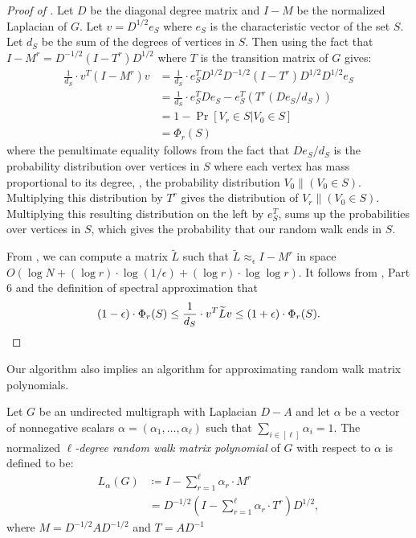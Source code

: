 \documentclass{toc}
\newcommand{\wt}{\widetilde}   %
\newcommand{\SC}{O(\log N + (\log r)\cdot\log(1/\epsilon)+(\log r)\cdot \log\log r)}
\numberwithin{myalgctr}{section}
\theoremstyle{named}
\begin{document}
\begin{proof}[Proof of ]
Let $D$ be the diagonal degree matrix and $I-M$ be the normalized Laplacian of $G$. Let $v=D^{1/2}e_S$ where $e_S$ is the characteristic vector of the set $S$. Let $d_S$ be the sum of the degrees of vertices in $S$. Then using the fact that $I-M^r=D^{-1/2}(I-T^r)D^{1/2}$ where $T$ is the transition matrix of $G$ gives:
\begin{align*}
\frac{1}{d_S}\cdot v^{T}(I-M^r)v &= \frac{1}{d_S}\cdot e_S^{T}D^{1/2}D^{-1/2}(I-T^r)D^{1/2}D^{1/2}e_S \\
&=\frac{1}{d_S}\cdot e_S^{T}De_{S} -  e_S^{T}(T^{r}(De_S/d_S))\\
&=1-\Pr[V_r\in S| V_0\in S]\\
&=\Phi_r(S)
\end{align*}
where the penultimate equality follows from the fact that $De_S/d_S$ is the probability distribution over vertices in $S$ where each vertex has mass proportional to its degree, \ie, the probability distribution $V_0\|(V_0\in S)$. Multiplying this distribution by $T^r$ gives the distribution of $V_r\|(V_0\in S)$. Multiplying this resulting distribution on the left by $e_S^{T}$, sums up the probabilities over vertices in $S$, which gives the probability that our random walk ends in $S$. 

{}From , we can compute a matrix $\wt{L}$ such that $\wt{L}\approx_{\epsilon} I-M^r$ in space $\SC$. It follows from , Part 6 and the definition of spectral approximation that 
\[
(1-\epsilon)\cdot \Phi_{r}(S)\leq \frac{1}{d_S}\cdot v^{T}\wt{L}v\leq (1+\epsilon)\cdot \Phi_{r}(S).    \qedhere
\]
\end{proof}
Our algorithm also implies an algorithm for approximating random walk matrix polynomials.
\begin{definition}
Let $G$ be an undirected multigraph with Laplacian $D-A$ and let $\alpha$ be a vector of nonnegative scalars $\alpha=(\alpha_1,\ldots,\alpha_{\ell})$ such that $\sum_{i\in[\ell]}\alpha_i=1$. The normalized \emph{$\ell$-degree random walk matrix polynomial} of $G$ with respect to $\alpha$ is defined to be:
\begin{align*}
L_{\alpha}(G)&\coloneqq I-\sum_{r=1}^{\ell}\alpha_{r}\cdot M^r\\
&=D^{-1/2}\left(I-\sum_{r=1}^{\ell}\alpha_r\cdot T^r\right)D^{1/2},
\end{align*}
where $M=D^{-1/2}AD^{-1/2}$ and $T=AD^{-1}$
\end{definition}
\end{document}
